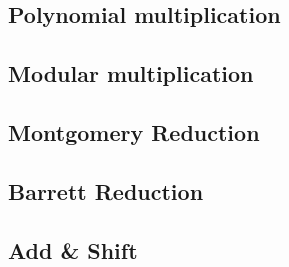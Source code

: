 \documentclass[11pt,
  titlepage=false,
  abstract=on,
]{scrreprt}
\begin{document}
\subsection{Polynomial multiplication}
\subsection{Modular multiplication}
\subsection{Montgomery Reduction}
\subsection{Barrett Reduction}
\subsection{Add \& Shift}






\end{document}
